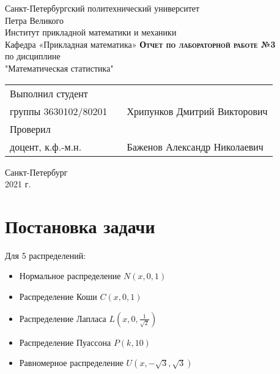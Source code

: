 \documentclass[12pt,a4paper]{article}
\begin{document}
    \begin{titlepage}
        \begin{center}
            \large
            Санкт-Петербургский политехнический университет\\Петра Великого\\
            \vspace{0.5cm}
            Институт прикладной математики и механики\\
            \vspace{0.25cm}
            Кафедра «Прикладная математика»
            \vfill
            \textsc{\LARGE\textbf{Отчет по лабораторной работе №3}}\\[5mm]
            \Large
            по дисциплине\\"Математическая статистика"
        \end{center}
        \vfill
        \begin{tabular}{l p{175pt} l}
            Выполнил студент \\ группы 3630102/80201 && Хрипунков Дмитрий Викторович
            \vspace{0.25cm}
            \\Проверил \\ доцент, к.ф.-м.н. && Баженов Александр Николаевич
        \end{tabular}
        \vfill
        \begin{center}
            Санкт-Петербург \\ 2021 г.
        \end{center}
    \end{titlepage}

\newpage
\begin{center}
    \tableofcontents
    \setcounter{page}{2}
\end{center}
\newpage
\begin{center}
    \listoffigures
\end{center}

\newpage
\section{Постановка задачи}
Для 5 распределений:
\begin{itemize}
    \item Нормальное распределение $N(x,0,1)$
    \item Распределение Коши $C(x,0,1)$
    \item Распределение Лапласа $L(x,0,\frac{1}{\sqrt{2}})$
    \item Распределение Пуассона $P(k,10)$
    \item Равномерное распределение $U(x,-\sqrt{3},\sqrt{3})$
\end{itemize}
\end{document}
